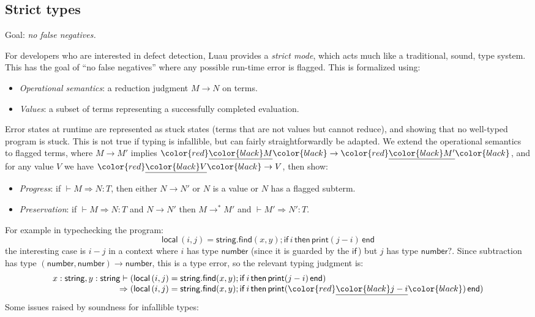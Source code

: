 \documentclass[acmsmall]{acmart}
\newcommand{\squnder}[1]{\color{red}\underline{{\color{black}#1}}\color{black}}
\newcommand{\NUMBER}{\mathsf{number}}
\newcommand{\STRING}{\mathsf{string}}
\newcommand{\IF}{\mathsf{if}\,}
\newcommand{\LOCAL}{\mathsf{local}\,}
\newcommand{\THEN}{\,\mathsf{then}\,}
\newcommand{\END}{\,\mathsf{end}}
\newcommand{\FIND}{\mathsf{find}}
\newcommand{\PRINT}{\mathsf{print}}
\begin{document}
\subsection{Strict types}

Goal: \emph{no false negatives.}

For developers who are interested in defect detection, Luau provides a \emph{strict mode},
which acts much like a traditional, sound, type system. This has the goal of ``no false negatives''
where any possible run-time error is flagged. This is formalized using:
\begin{itemize}
\item \emph{Operational semantics}: a reduction judgment $M \rightarrow N$ on terms.
\item \emph{Values}: a subset of terms representing a successfully completed evaluation.
\end{itemize}
Error states at runtime are represented as stuck states (terms that are not
values but cannot reduce), and showing that no well-typed program is
stuck. This is not true if typing is infallible, but can fairly
straightforwardly be adapted. We extend the operational semantics to flagged terms,
where $M \rightarrow M'$ implies $\squnder{M} \rightarrow \squnder{M'}$, and
for any value $V$ we have $\squnder{V} \rightarrow V$, then show:
\begin{itemize}
\item \emph{Progress}: if ${} \vdash M \Rightarrow N : T$, then either $N \rightarrow N'$ or $N$ is a value or $N$ has a flagged subterm.
\item \emph{Preservation}: if ${} \vdash M \Rightarrow N : T$ and $N \rightarrow N'$ then  $M \rightarrow^*M'$ and ${} \vdash M' \Rightarrow N' : T$.
\end{itemize}
For example in typechecking the program:
\[
  \LOCAL (i,j) = \STRING.\FIND(x, y);
  \IF i \THEN \PRINT(j-i) \END
\]
the interesting case is $i-j$ in a context where  $i$ has type
$\NUMBER$ (since it is guarded by the $\IF$) but $j$ has type
$\NUMBER?$. Since subtraction has type $(\NUMBER, \NUMBER) \rightarrow \NUMBER$,
this is a type error, so the relevant typing judgment is:
\[\begin{array}{r@{}l}
  x: \STRING, y: \STRING \vdash {}&
  (\LOCAL (i,j) = \STRING.\FIND(x, y);
  \IF i \THEN \PRINT(j-i) \END) \\
  \Rightarrow {}&
  (\LOCAL (i,j) = \STRING.\FIND(x, y);
  \IF i \THEN \PRINT(\squnder{j-i}) \END)
\end{array}\]
Some issues raised by soundness for infallible types:
\end{document}
